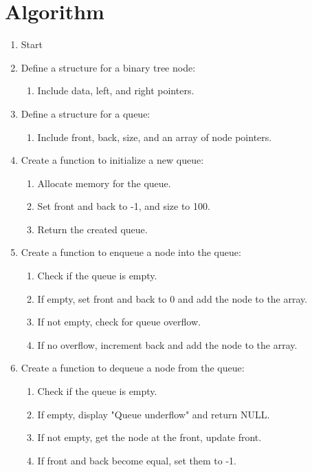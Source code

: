 
\section{Algorithm}

\begin{enumerate}[label=\arabic*.]
    \item Start
    
    \item Define a structure for a binary tree node:
    \begin{enumerate}[label=\arabic{enumi}.\arabic*.]
        \item Include data, left, and right pointers.
    \end{enumerate}
    
    \item Define a structure for a queue:
    \begin{enumerate}[label=\arabic{enumi}.\arabic*.]
        \item Include front, back, size, and an array of node pointers.
    \end{enumerate}
    
    \item Create a function to initialize a new queue:
    \begin{enumerate}[label=\arabic{enumi}.\arabic*.]
        \item Allocate memory for the queue.
        \item Set front and back to -1, and size to 100.
        \item Return the created queue.
    \end{enumerate}
    
    \item Create a function to enqueue a node into the queue:
    \begin{enumerate}[label=\arabic{enumi}.\arabic*.]
        \item Check if the queue is empty.
        \item If empty, set front and back to 0 and add the node to the array.
        \item If not empty, check for queue overflow.
        \item If no overflow, increment back and add the node to the array.
    \end{enumerate}
    
    \item Create a function to dequeue a node from the queue:
    \begin{enumerate}[label=\arabic{enumi}.\arabic*.]
        \item Check if the queue is empty.
        \item If empty, display "Queue underflow" and return NULL.
        \item If not empty, get the node at the front, update front.
        \item If front and back become equal, set them to -1.
    \end{enumerate}
    

\end{enumerate}
